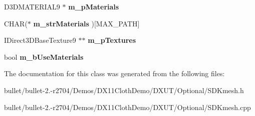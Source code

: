 \begin{DoxyCompactItemize}
\item 
\hypertarget{class_c_d_x_u_t_x_file_mesh_a34b71a6bdc4f60569b4b0fab16822a8b}{D3\+D\+M\+A\+T\+E\+R\+I\+A\+L9 $\ast$ {\bfseries m\+\_\+p\+Materials}}\label{class_c_d_x_u_t_x_file_mesh_a34b71a6bdc4f60569b4b0fab16822a8b}

\item 
\hypertarget{class_c_d_x_u_t_x_file_mesh_a900d895aa1896228e52236ead38e3b42}{C\+H\+A\+R($\ast$ {\bfseries m\+\_\+str\+Materials} )\mbox{[}M\+A\+X\+\_\+\+P\+A\+T\+H\mbox{]}}\label{class_c_d_x_u_t_x_file_mesh_a900d895aa1896228e52236ead38e3b42}

\item 
\hypertarget{class_c_d_x_u_t_x_file_mesh_a740ecd3f879414e81562a30580e51926}{I\+Direct3\+D\+Base\+Texture9 $\ast$$\ast$ {\bfseries m\+\_\+p\+Textures}}\label{class_c_d_x_u_t_x_file_mesh_a740ecd3f879414e81562a30580e51926}

\item 
\hypertarget{class_c_d_x_u_t_x_file_mesh_a8ba1f63c6df2d73ae41cbfbdae52ed14}{bool {\bfseries m\+\_\+b\+Use\+Materials}}\label{class_c_d_x_u_t_x_file_mesh_a8ba1f63c6df2d73ae41cbfbdae52ed14}

\end{DoxyCompactItemize}


The documentation for this class was generated from the following files\+:\begin{DoxyCompactItemize}
\item 
bullet/bullet-\/2.-\/r2704/\+Demos/\+D\+X11\+Cloth\+Demo/\+D\+X\+U\+T/\+Optional/S\+D\+Kmesh.\+h\item 
bullet/bullet-\/2.-\/r2704/\+Demos/\+D\+X11\+Cloth\+Demo/\+D\+X\+U\+T/\+Optional/S\+D\+Kmesh.\+cpp\end{DoxyCompactItemize}
